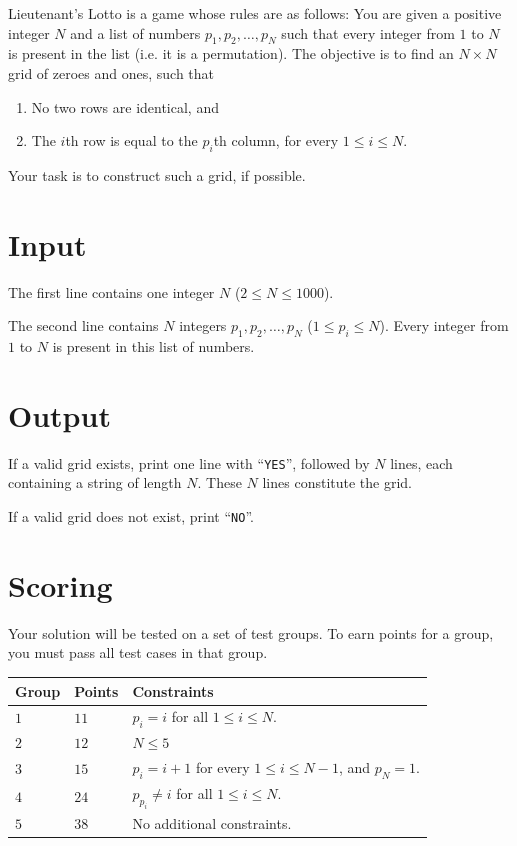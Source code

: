 \noindent

Lieutenant's Lotto is a game whose rules are as follows:
 You are given a positive integer $N$ and a list of numbers $p_1, p_2, \dots, p_N$ such that every integer from $1$ to 
 $N$ is present in the list (i.e. it is a permutation). The objective is to find an $N \times N$ grid of zeroes and ones, 
 such that 
 \begin{enumerate}
    \item No two rows are identical, and
    \item The $i$th row is equal to the $p_i$th column, for every $1 \leq i \leq N$.
 \end{enumerate}

 Your task is to construct such a grid, if possible.

\section*{Input}

The first line contains one integer $N$ ($2 \leq N \leq 1000$).

The second line contains $N$ integers $p_1, p_2, \dots, p_N$ ($1 \leq p_i \leq N$). Every integer from $1$ to $N$
is present in this list of numbers.

\section*{Output}

If a valid grid exists, print one line with ``\texttt{YES}'', followed by $N$ lines, each containing a string of 
length $N$. These $N$ lines constitute the grid.


If a valid grid does not exist, print ``\texttt{NO}''.

\section*{Scoring}
Your solution will be tested on a set of test groups.
To earn points for a group, you must pass all test cases in that group.

\noindent
\begin{tabular}{| l | l | p{12cm} |}
  \hline
  \textbf{Group} & \textbf{Points} & \textbf{Constraints} \\ \hline
  $1$    & $11$       & $p_i = i$ for all $1 \leq i \leq N$. \\ \hline
  $2$    & $12$       & $N \leq 5$ \\ \hline
  $3$    & $15$       & $p_i = i+1$ for every $1 \leq i \leq N-1$, and $p_N = 1$.  \\ \hline
  $4$    & $24$       & $p_{p_i} \neq i$ for all $1 \leq i \leq N$. \\ \hline
  $5$    & $38$       & No additional constraints. \\ \hline
\end{tabular}

